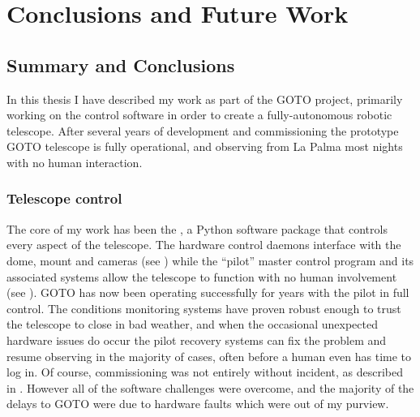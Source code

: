 \chapter{Conclusions and Future Work}
\label{chap:conclusion}
\chaptoc{}


\newpage
\section{Summary and Conclusions}
\label{sec:conclusion}
\begin{colsection}


\begin{colsection}

In this thesis I have described my work as part of the GOTO project, primarily working on the control software in order to create a fully-autonomous robotic telescope. After several years of development and commissioning the prototype GOTO telescope is fully operational, and observing from La Palma most nights with no human interaction.

\end{colsection}


\subsection{Telescope control}
\label{sec:control_results}
\begin{colsection}

The core of my work has been the , a Python software package that controls every aspect of the telescope. The hardware control daemons interface with the dome, mount and cameras (see ) while the ``pilot'' master control program and its associated systems allow the telescope to function with no human involvement (see ). GOTO has now been operating successfully for years with the pilot in full control. The conditions monitoring systems have proven robust enough to trust the telescope to close in bad weather, and when the occasional unexpected hardware issues do occur the pilot recovery systems can fix the problem and resume observing in the majority of cases, often before a human even has time to log in. Of course, commissioning was not entirely without incident, as described in . However all of the software challenges were overcome, and the majority of the delays to GOTO were due to hardware faults which were out of my purview.


\end{colsection}
\end{colsection}
